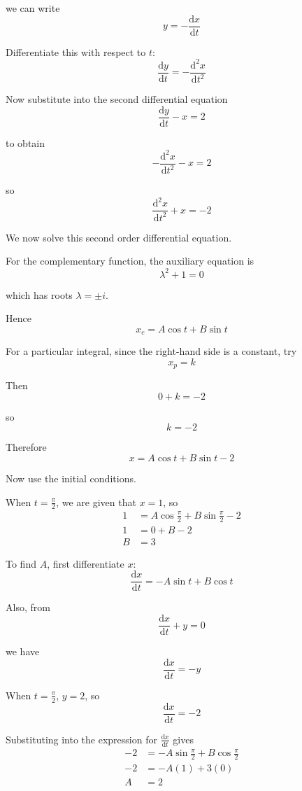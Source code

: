 \documentclass[leqno]{article}
\begin{document}
\begin{enumerate}[
  label=\textbf{\arabic*.},
  leftmargin=*,
  topsep=0pt,
  partopsep=0pt,
  parsep=0pt
]
\begin{djsSolution}
  we can write
  \[
  y=-\frac{\mathrm{d}x}{\mathrm{d}t}
  \]
  
  Differentiate this with respect to $t$:
  \[
  \frac{\mathrm{d}y}{\mathrm{d}t}=-\frac{\mathrm{d}^2x}{\mathrm{d}t^2}
  \]
  
  Now substitute into the second differential equation
  \[
  \frac{\mathrm{d}y}{\mathrm{d}t}-x=2
  \]

  to obtain
  \[
  -\frac{\mathrm{d}^2x}{\mathrm{d}t^2}-x=2
  \]

  so
  \[
  \frac{\mathrm{d}^2x}{\mathrm{d}t^2}+x=-2
  \]
  
  We now solve this second order differential equation.
  
  For the complementary function, the auxiliary equation is
  \[
  \lambda^2+1=0
  \]

  which has roots $\lambda=\pm i$.
  
  Hence
  \[
  x_c=A\cos t+B\sin t
  \]
  
  For a particular integral, since the right-hand side is a constant, try
  \[
  x_p=k
  \]

  Then
  \[
  0+k=-2
  \]

  so
  \[
  k=-2
  \]
  
  Therefore
  \[
  x=A\cos t+B\sin t-2
  \]
  
  Now use the initial conditions.
  
  When $t=\frac{\pi}{2}$, we are given that $x=1$, so
  \begin{align*}
  1&=A\cos \frac{\pi}{2}+B\sin \frac{\pi}{2}-2 \\
  1&=0+B-2 \\
  B&=3
  \end{align*}
  
  To find $A$, first differentiate $x$:
  \[
  \frac{\mathrm{d}x}{\mathrm{d}t}=-A\sin t+B\cos t
  \]
  
  Also, from
  \[
  \frac{\mathrm{d}x}{\mathrm{d}t}+y=0
  \]

  we have
  \[
  \frac{\mathrm{d}x}{\mathrm{d}t}=-y
  \]
  
  When $t=\frac{\pi}{2}$, $y=2$, so
  \[
  \frac{\mathrm{d}x}{\mathrm{d}t}=-2
  \]
  
  Substituting into the expression for $\frac{\mathrm{d}x}{\mathrm{d}t}$ gives
  \begin{align*}
  -2&=-A\sin \frac{\pi}{2}+B\cos \frac{\pi}{2} \\
  -2&=-A(1)+3(0) \\
  A&=2
  \end{align*}
  

\end{djsSolution}
\end{enumerate}
\end{document}
